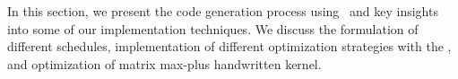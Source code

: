 In this section, we present the code generation process using \alphaz\ and key insights into some of our implementation techniques. We discuss the formulation of different schedules, implementation of different optimization strategies with the \alphaz, and optimization of matrix max-plus handwritten kernel. 
\subsection{\alphaz\ }\label{sec:alphaz}


